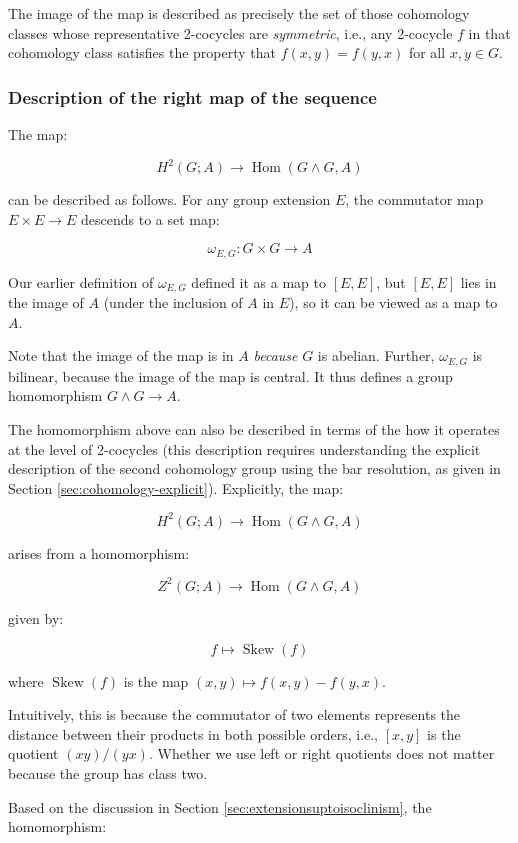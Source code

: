 \documentclass{ucetd}
\begin{document}
The image of the map is described as precisely the set of those
cohomology classes whose representative 2-cocycles are {\em
  symmetric}, i.e., any 2-cocycle $f$ in that cohomology class
satisfies the property that $f(x,y) = f(y,x)$ for all $x,y \in G$.

\subsubsection{Description of the right map of the sequence}\label{sec:ses-uct-abelian-right-map}

The map:

$$H^2(G;A) \to \operatorname{Hom}(G \wedge G,A)$$

can be described as follows. For any group extension $E$, the
commutator map $E \times E \to E$ descends to a set map:

$$\omega_{E,G}: G \times G \to A$$

Our earlier definition of $\omega_{E,G}$ defined it as a map to
$[E,E]$, but $[E,E]$ lies in the image of $A$ (under the inclusion of
$A$ in $E$), so it can be viewed as a map to $A$.

Note that the image of the map is in $A$ {\em because} $G$ is
abelian. Further, $\omega_{E,G}$ is bilinear, because the image of the map
is central. It thus defines a group homomorphism $G \wedge G \to A$.

The homomorphism above can also be described in terms of the how it
operates at the level of $2$-cocycles (this description requires
understanding the explicit description of the second cohomology group
using the bar resolution, as given in Section
\ref{sec:cohomology-explicit}). Explicitly, the map:

$$H^2(G;A) \to \operatorname{Hom}(G \wedge G,A)$$

arises from a homomorphism:

$$Z^2(G;A) \to \operatorname{Hom}(G \wedge G,A)$$

given by:

$$f \mapsto \operatorname{Skew}(f)$$

where $\operatorname{Skew}(f)$ is the map $(x,y) \mapsto f(x,y) -
f(y,x)$.

Intuitively, this is because the commutator of two elements represents
the distance between their products in both possible orders, i.e.,
$[x,y]$ is the quotient $(xy)/(yx)$. Whether we use left or right
quotients does not matter because the group has class two.

Based on the discussion in Section \ref{sec:extensionsuptoisoclinism},
the homomorphism:
\end{document}
